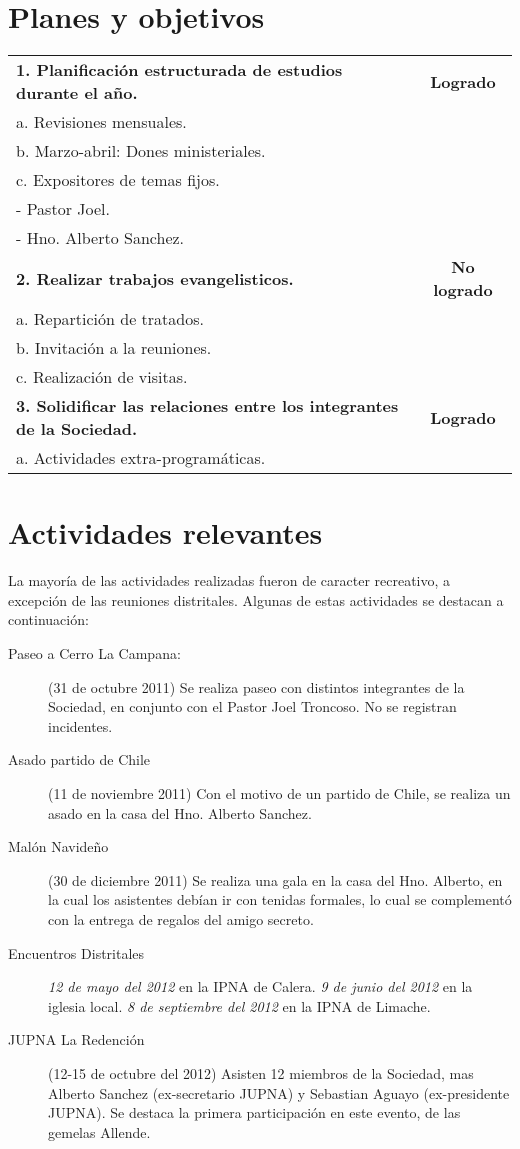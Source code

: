 \documentclass[12pt,letterpaper]{article}
\newcommand{\tab}{\hspace*{4em}}
\begin{document}
\section{Planes y objetivos}
\begin{table}[!h]
\begin{tabular}{l c}
\textbf{1. Planificación estructurada de estudios durante el año.} & \textbf{Logrado} \\
\tab a. Revisiones mensuales. \\
\tab b. Marzo-abril: Dones ministeriales.\\
\tab c. Expositores de temas fijos. \\
\tab \tab - Pastor Joel.\\
\tab \tab - Hno. Alberto Sanchez.\\
\textbf{2. Realizar trabajos evangelisticos.} & \textbf{No logrado} \\
\tab a. Repartición de tratados. \\
\tab b. Invitación a la reuniones. \\
\tab c. Realización de visitas.\\
\textbf{3. Solidificar las relaciones entre los integrantes de la Sociedad.} & \textbf{Logrado}\\
\tab a. Actividades extra-programáticas.
\end{tabular}
\end{table}

\section{Actividades relevantes}

La mayoría de las actividades realizadas fueron de caracter recreativo, a excepción de las reuniones distritales. Algunas de estas actividades se destacan a continuación:

\begin{description}
\item[Paseo a Cerro La Campana:] (31 de octubre 2011) Se realiza paseo con distintos integrantes de la Sociedad, en conjunto con el Pastor Joel Troncoso. No se registran incidentes.
\item[Asado partido de Chile] (11 de noviembre 2011) Con el motivo de un partido de Chile, se realiza  un asado en la casa del Hno. Alberto Sanchez.
\item[Malón Navideño] (30 de diciembre 2011) Se realiza una gala en la casa del Hno. Alberto, en la cual los asistentes debían ir con tenidas formales, lo cual se complementó con la entrega de regalos del amigo secreto.
\item[Encuentros Distritales] \textit{12 de mayo del 2012} en la IPNA de Calera. \textit{9 de junio del 2012} en la iglesia local. \textit{8 de septiembre del 2012} en la IPNA de Limache.
\item[JUPNA La Redención] (12-15 de octubre del 2012) Asisten 12 miembros de la Sociedad, mas Alberto Sanchez (ex-secretario JUPNA) y Sebastian Aguayo (ex-presidente JUPNA). Se destaca la primera participación en este evento, de las gemelas Allende.
\end{description}
\end{document}
